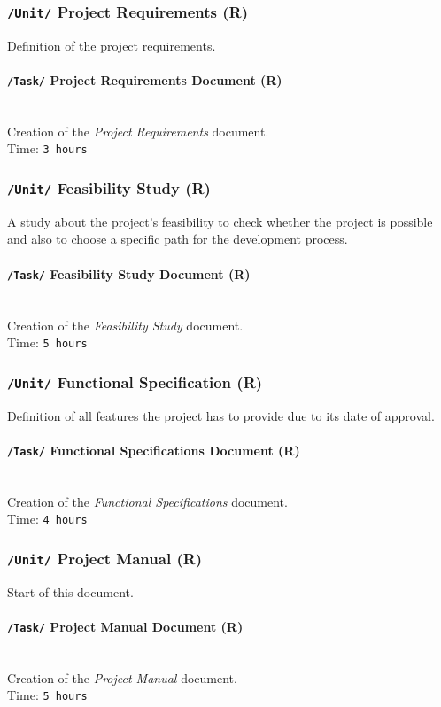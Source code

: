 \documentclass[11pt]{article}
\begin{document}
\subsubsection{\texttt{/Unit/} Project Requirements \small{(R)}}
Definition of the project requirements.
\paragraph{\texttt{/Task/} Project Requirements Document \small{(R)}}~\\
Creation of the \textit{Project Requirements} document.
\\ Time: \texttt{3 hours}
\subsubsection{\texttt{/Unit/} Feasibility Study \small{(R)}}
A study about the project's feasibility to check whether the project is possible and also to choose a specific path for the development process.
\paragraph{\texttt{/Task/} Feasibility Study Document \small{(R)}}~\\
Creation of the \textit{Feasibility Study} document.
\\ Time: \texttt{5 hours}
\subsubsection{\texttt{/Unit/} Functional Specification \small{(R)}}
Definition of all features the project has to provide due to its date of approval.
\paragraph{\texttt{/Task/} Functional Specifications Document \small{(R)}}~\\
Creation of the \textit{Functional Specifications} document.
\\ Time: \texttt{4 hours}
\subsubsection{\texttt{/Unit/} Project Manual \small{(R)}}
Start of this document.
\paragraph{\texttt{/Task/} Project Manual Document \small{(R)}}~\\
Creation of the \textit{Project Manual} document.
\\ Time: \texttt{5 hours}
\end{document}
